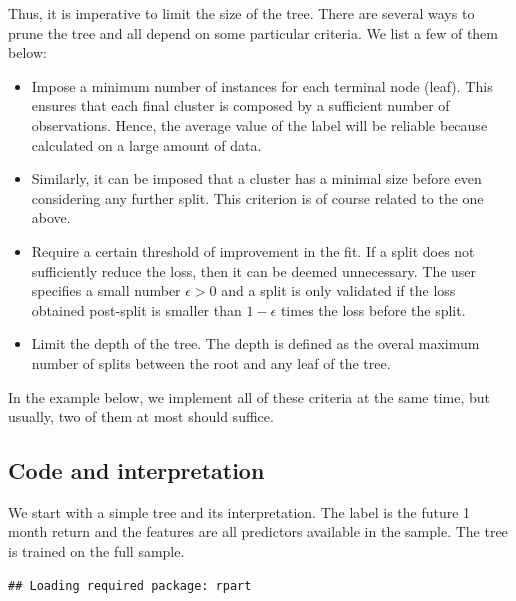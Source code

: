 \documentclass[]{krantz}
\providecommand{\tightlist}{%
  \setlength{\itemsep}{0pt}\setlength{\parskip}{0pt}}
\theoremstyle{definition}
\theoremstyle{definition}
\theoremstyle{definition}
\theoremstyle{remark}
\begin{document}
Thus, it is imperative to limit the size of the tree. There are several
ways to prune the tree and all depend on some particular criteria. We
list a few of them below:

\begin{itemize}
\tightlist
\item
  Impose a minimum number of instances for each terminal node (leaf).
  This ensures that each final cluster is composed by a sufficient
  number of observations. Hence, the average value of the label will be
  reliable because calculated on a large amount of data.\\
\item
  Similarly, it can be imposed that a cluster has a minimal size before
  even considering any further split. This criterion is of course
  related to the one above.\\
\item
  Require a certain threshold of improvement in the fit. If a split does
  not sufficiently reduce the loss, then it can be deemed unnecessary.
  The user specifies a small number \(\epsilon>0\) and a split is only
  validated if the loss obtained post-split is smaller than
  \(1-\epsilon\) times the loss before the split.\\
\item
  Limit the depth of the tree. The depth is defined as the overal
  maximum number of splits between the root and any leaf of the tree.
\end{itemize}

In the example below, we implement all of these criteria at the same
time, but usually, two of them at most should suffice.

\hypertarget{code-and-interpretation}{%
\subsection{Code and interpretation}\label{code-and-interpretation}}

We start with a simple tree and its interpretation. The label is the
future 1 month return and the features are all predictors available in
the sample. The tree is trained on the full sample.

\begin{verbatim}
## Loading required package: rpart
\end{verbatim}

\footnotesize
\end{document}
